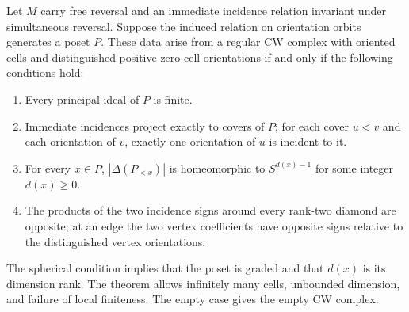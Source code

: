 \begin{theorem}
\label{SA21-C08}
Let $M$ carry free reversal and an immediate incidence relation invariant
under simultaneous reversal. Suppose the induced relation on orientation
orbits generates a poset $P$. These data arise from a regular CW complex
with oriented cells and distinguished positive zero-cell orientations
if and only if the following conditions hold:
\begin{enumerate}
\item Every principal ideal of $P$ is finite.
\item Immediate incidences project exactly to covers of $P$; for each
cover $u<v$ and each orientation of $v$, exactly one orientation of $u$
is incident to it.
\item For every $x\in P$, $|\Delta(P_{<x})|$ is homeomorphic to
$S^{d(x)-1}$ for some integer $d(x)\ge0$.
\item The products of the two incidence signs around every rank-two
diamond are opposite; at an edge the two vertex coefficients have
opposite signs relative to the distinguished vertex orientations.
\end{enumerate}
The spherical condition implies that the poset is graded and that
$d(x)$ is its dimension rank. The theorem
allows infinitely many cells, unbounded dimension, and failure of local
finiteness. The empty case gives the empty CW complex.
\end{theorem}
